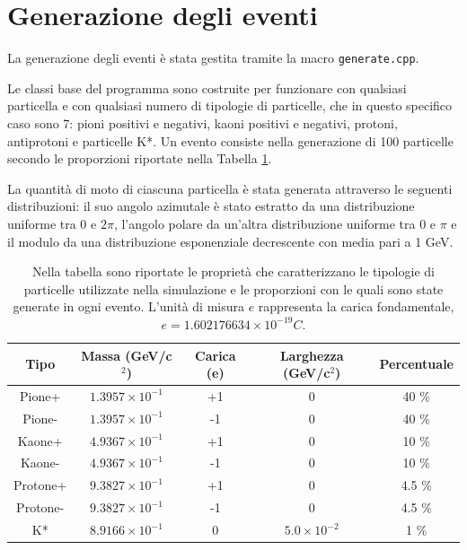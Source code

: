 \documentclass{article}
\begin{document}
\newpage

\section{Generazione degli eventi}

La generazione degli eventi è stata gestita tramite la macro \verb|generate.cpp|.

Le classi base del programma sono costruite per funzionare con qualsiasi particella e con qualsiasi numero di tipologie di particelle, che in questo specifico caso sono 7: pioni positivi e negativi, kaoni positivi e negativi, protoni, antiprotoni e particelle K*. Un evento consiste nella generazione di 100 particelle secondo le proporzioni riportate nella Tabella \ref{tab:particles_table}.

La quantità di moto di ciascuna particella è stata generata attraverso le seguenti distribuzioni: il suo angolo azimutale è stato estratto da una distribuzione uniforme tra 0 e $ 2 \pi $, l'angolo polare da un'altra distribuzione uniforme tra 0 e $ \pi $ e il modulo da una distribuzione esponenziale decrescente con media pari a 1 GeV.

\begin{table}[ht]\label{tab:particles_table}
    \centering
    \begin{tabular}{|c|c|c|c|c|}
    \hline
    Tipo & Massa (GeV/c$^2$) & Carica (e) & Larghezza (GeV/c$^2$) & Percentuale \\
    \hline
    Pione+ & $1.3957\times10^{-1}$ & +1 & 0 & 40 \% \\
    \hline
    Pione- & $1.3957\times10^{-1}$ & -1 & 0 & 40 \% \\
    \hline
    Kaone+ & $4.9367\times10^{-1}$ & +1 & 0 & 10 \% \\
    \hline
    Kaone- & $4.9367\times10^{-1}$ & -1 & 0 & 10 \% \\
    \hline
    Protone+ & $9.3827\times10^{-1}$ & +1 & 0 & 4.5 \% \\
    \hline
    Protone- & $9.3827\times10^{-1}$ & -1 & 0 & 4.5 \% \\
    \hline
    K* & $8.9166\times10^{-1}$ & 0 & $5.0\times10^{-2}$ & 1 \% \\
    \hline
    \end{tabular}
    \caption{Nella tabella sono riportate le proprietà che caratterizzano le tipologie di particelle utilizzate nella simulazione e le proporzioni con le quali sono state generate in ogni evento. L'unità di misura $e$ rappresenta la carica fondamentale, $e = 1.602176634\times10^{-19}C$.}
\end{table}
\end{document}
